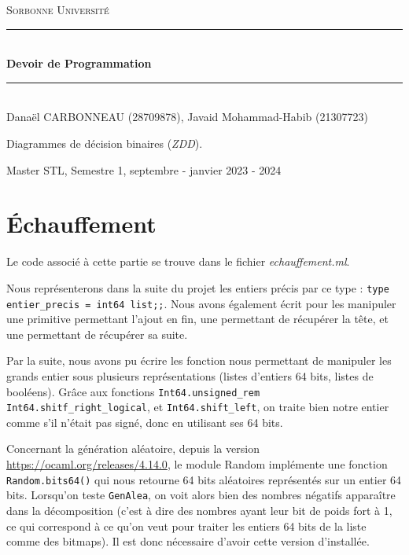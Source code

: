 \documentclass[12pt,a4paper]{article}
\author{Javaid Mohammad-Habib, Carbonneau Danaël}
\begin{document}
\begin{titlepage}
\newcommand{\HRule}{\rule{\linewidth}{0.5mm}}



\center 
\bigskip
\textsc{\LARGE
Sorbonne Université
}
 \\[4cm]
 \HRule \\[0.4cm]
{ \huge \bfseries Devoir de Programmation \\[0.15cm] }

\HRule \\[1cm]

Danaël CARBONNEAU (28709878), Javaid Mohammad-Habib (21307723) \\[2cm]

\begin{huge}
Diagrammes de décision binaires (\textit{ZDD}).
\end{huge}

\vfill

Master STL, Semestre 1, septembre - janvier 2023 - 2024 \\ [1cm]

\end{titlepage}



\tableofcontents



\newpage

\section{Échauffement}

Le code associé à cette partie se trouve dans le fichier \textit{echauffement.ml}. 

Nous représenterons dans la suite du projet les entiers précis par ce type : \texttt{type entier\_precis = int64 list;;}. Nous avons également écrit pour les manipuler une primitive permettant l'ajout en fin, une permettant de récupérer la tête, et une permettant de récupérer sa suite.

Par la suite, nous avons pu écrire les fonction nous permettant de manipuler les grands entier sous plusieurs représentations (listes d'entiers 64 bits, listes de booléens). Grâce aux fonctions \texttt{Int64.unsigned\_rem} \texttt{Int64.shitf\_right\_logical}, et \texttt{Int64.shift\_left}, on traite bien notre entier comme s'il n'était pas signé, donc en utilisant ses 64 bits.

Concernant la génération aléatoire, depuis la version \href{4.14}{https://ocaml.org/releases/4.14.0}, le module Random implémente une fonction \texttt{Random.bits64()} qui nous retourne 64 bits aléatoires représentés sur un entier 64 bits. Lorsqu'on teste \texttt{GenAlea}, on voit alors bien des nombres négatifs apparaître dans la décomposition (c'est à dire des nombres ayant leur bit de poids fort à 1, ce qui correspond à ce qu'on veut pour traiter les entiers 64 bits de la liste comme des bitmaps). Il est donc nécessaire d'avoir cette version d'installée.
\end{document}
